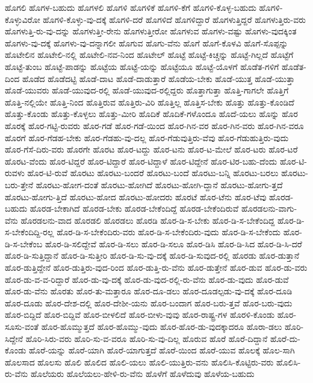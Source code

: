 {ಹೊಗಲಿ
ಹೊಗಳ-ಬಹುದು
ಹೊಗಳಲಿ
ಹೊಗಳಿ
ಹೊಗಳಿಕೆ
ಹೊಗಳಿ-ಕೆಗೆ
ಹೊಗಳಿ-ಕೊಳ್ಳ-ಬಹುದು
ಹೊಗಳಿ-ಕೊಳ್ಳುವಿರೋ
ಹೊಗಳಿ-ಕೊಳ್ಳು-ವು-ದಕ್ಕೆ
ಹೊಗಳಿ-ದರೆ
ಹೊಗಳಿದೆ
ಹೊಗಳಿದ್ದಾರೆ
ಹೊಗಳುತ್ತಿದ್ದರೆ
ಹೊಗಳುತ್ತಿರು-ವರು
ಹೊಗಳುತ್ತಿ-ರು-ವು-ದನ್ನು
ಹೊಗಳುತ್ತೀ-ರೇನು
ಹೊಗಳುತ್ತೀರೋ
ಹೊಗಳುವ
ಹೊಗಳು-ವಷ್ಟು
ಹೊಗಳು-ವುದಕ್ಕಿಂತ
ಹೊಗಳು-ವು-ದಕ್ಕೆ
ಹೊಗಳು-ವು-ದನ್ನಾಗಲೀ
ಹೊಗುವ
ಹೊಗು-ವೆನು
ಹೊಗೆ
ಹೊಗೆ-ಕೊಳವಿ
ಹೊಗೆ-ಸೊಪ್ಪನ್ನು
ಹೊಟೇಲಿನ
ಹೊಟೇಲಿ-ನಲ್ಲಿ
ಹೊಟೇಲಿ-ನವ-ನಿಂದ
ಹೊಟೇಲ್
ಹೊಟ್ಟೆ
ಹೊಟ್ಟೆ-ಕಿಚ್ಚನ್ನು
ಹೊಟ್ಟೆ-ಗಿಲ್ಲದೆ
ಹೊಟ್ಟೆಗೆ
ಹೊಟ್ಟೆ-ತುಂಬ
ಹೊಟ್ಟೆ-ಪಾಡನ್ನು
ಹೊಟ್ಟೆಯ
ಹೊಟ್ಟೆ-ಯನ್ನು
ಹೊಟ್ಟೆಯೂ
ಹೊಟ್ಟೆ-ಯೊಳಗೆ
ಹೊಡೆತ-ಗಳಿಗೆ
ಹೊಡೆತ-ದಿಂದ
ಹೊಡೆದ
ಹೊಡೆದಟ್ಟಿ
ಹೊಡೆ-ದಾಟ
ಹೊಡೆ-ದಾಡುತ್ತಾರೆ
ಹೊಡೆಯ-ಬೇಕು
ಹೊಡೆ-ಯುತ್ತ
ಹೊಡೆ-ಯುತ್ತಾ
ಹೊಡೆ-ಯುವರು
ಹೊಡೆ-ಯುವುದ-ರಲ್ಲಿ
ಹೊಡೆ-ಯುವುದ-ರಲ್ಲಿದ್ದರು
ಹೊತ್ತಾಗುತ್ತಾ
ಹೊತ್ತಿ-ಗಾಗಲೇ
ಹೊತ್ತಿಗೆ
ಹೊತ್ತಿ-ನಲ್ಲಿಯೇ
ಹೊತ್ತಿ-ನಿಂದ
ಹೊತ್ತಿರುವ
ಹೊತ್ತಿರು-ವಿರಿ
ಹೊತ್ತಿಲ್ಲ
ಹೊತ್ತಿಸ-ಬೇಕು
ಹೊತ್ತು
ಹೊತ್ತು-ಕೊಂಡಿದೆ
ಹೊತ್ತು-ಕೊಂಡು
ಹೊತ್ತು-ಕೊಳ್ಳಲು
ಹೊತ್ತು-ಮೀರಿ
ಹೊದಿಕೆ
ಹೊದಿಕೆ-ಗಳೊಂದೂ
ಹೊದೆ-ಯಲು
ಹೊನ್ನು
ಹೊರ
ಹೊರಕ್ಕೆ
ಹೊರ-ಗಟ್ಟಿ-ರುವರು
ಹೊರ-ಗಡೆ
ಹೊರ-ಗಡೆ-ಯಿಂದ
ಹೊರ-ಗಿನ-ವರ
ಹೊರ-ಗಿನ-ವರು
ಹೊರ-ಗಿನ-ವರೂ
ಹೊರಗೆ
ಹೊರ-ಗೆಡಹ-ಬೇಕು
ಹೊರ-ಗೆಡಹು-ವು-ದಲ್ಲ
ಹೊರ-ಗೆಡುವುತ್ತಿರು-ವೆವು
ಹೊರ-ಗೆಡುಹುತ್ತಿರು-ವುದು
ಹೊರ-ಗೆಸೆ-ದಿರು-ವರು
ಹೊರಗೇ
ಹೊರಟ
ಹೊರ-ಟದ್ದು
ಹೊರ-ಟನು
ಹೊರ-ಟ-ಮೇಲೆ
ಹೊರ-ಟರು
ಹೊರ-ಟರೆ
ಹೊರಟ-ವೆಂದು
ಹೊರ-ಟಿದ್ದರೆ
ಹೊರ-ಟಿದ್ದಾರೆ
ಹೊರ-ಟಿದ್ದಾಳೆ
ಹೊರ-ಟಿದ್ದೇನೆ
ಹೊರ-ಟಿರ-ಬಹು-ದೆಂದು
ಹೊರ-ಟಿ-ರುವಳು
ಹೊರ-ಟಿ-ರುವೆ
ಹೊರಟು
ಹೊರಟು-ಬಂದರೆ
ಹೊರಟು-ಬಂದೆ
ಹೊರಟು-ಬನ್ನಿ
ಹೊರಟು-ಬರಲು
ಹೊರಟು-ಬರು-ತ್ತೇನೆ
ಹೊರಟು-ಹೋಗ-ದಂತೆ
ಹೊರಟು-ಹೋಗಿದೆ
ಹೊರಟು-ಹೋಗಿ-ದ್ದಾನೆ
ಹೊರಟು-ಹೋಗು-ತ್ತದೆ
ಹೊರಟು-ಹೋಗು-ತ್ತಿದೆ
ಹೊರಟು-ಹೋದ
ಹೊರಟು-ಹೋದರು
ಹೊರಟೆ
ಹೊರ-ಟೆನು
ಹೊರ-ಟೆವು
ಹೊರಡ-ಬಹುದು
ಹೊರಡ-ಬೇಕಾಗಿದೆ
ಹೊರಡ-ಬೇಕು
ಹೊರಡ-ಬೇಕೆಂದಿದ್ದೆ
ಹೊರಡ-ಬೇಕೆಂದಿರುವೆ
ಹೊರಡಲನು-ವಾಗು-ವೆನು
ಹೊರಡಲನು-ವಾದ
ಹೊರಡಲಿ
ಹೊರಡಲು
ಹೊರಡಿ
ಹೊರ-ಡಿ-ಸ-ಬೇಕು
ಹೊರ-ಡಿ-ಸ-ಬೇಕೆಂದಿದ್ದ
ಹೊರ-ಡಿ-ಸ-ಬೇಕೆಂದಿದ್ದಿ-ರಲ್ಲ
ಹೊರ-ಡಿ-ಸ-ಬೇಕೆಂದಿರು-ವರು
ಹೊರ-ಡಿ-ಸ-ಬೇಕೆಂದಿರು-ವುದು
ಹೊರ-ಡಿ-ಸ-ಬೇಕೆಂದು
ಹೊರ-ಡಿ-ಸ-ಬೇಕೆಂಬ
ಹೊರ-ಡಿ-ಸಲಿದ್ದೇವೆ
ಹೊರ-ಡಿ-ಸಲು
ಹೊರ-ಡಿ-ಸಲೂ
ಹೊರ-ಡಿಸಿ
ಹೊರ-ಡಿ-ಸಿದ
ಹೊರ-ಡಿ-ಸಿ-ದರೆ
ಹೊರ-ಡಿ-ಸುತ್ತಿದ್ದಾನೆ
ಹೊರ-ಡಿ-ಸುತ್ತೀರಿ
ಹೊರ-ಡಿ-ಸು-ವು-ದಕ್ಕೆ
ಹೊರ-ಡಿ-ಸುವುದ-ರಲ್ಲಿ
ಹೊರಡು
ಹೊರ-ಡುತ್ತಾನೆ
ಹೊರ-ಡುತ್ತಿದ್ದೇನೆ
ಹೊರ-ಡುತ್ತಿರು-ವುದ-ರಿಂದ
ಹೊರ-ಡುತ್ತಿ-ರು-ವೆನು
ಹೊರ-ಡುತ್ತೇನೆ
ಹೊರ-ಡುವ
ಹೊರ-ಡು-ವರು
ಹೊರ-ಡು-ವ-ವ-ರಿದ್ದಾರೆ
ಹೊರ-ಡು-ವು-ದಕ್ಕೆ
ಹೊರ-ಡು-ವುದ-ರಲ್ಲಿ-ರು-ವೆನು
ಹೊರ-ಡು-ವುದು
ಹೊರ-ಡುವೆ
ಹೊರ-ಡು-ವೆನು
ಹೊರತು
ಹೊರ-ತು-ಮತ್ತಾರೂ
ಹೊರ-ದೂ-ಡಲು
ಹೊರ-ದೂಡಲ್ಪಡು-ವು-ದಕ್ಕೆ
ಹೊರ-ದೂಡಿ
ಹೊರ-ದೂಡು
ಹೊರ-ದೇಶ-ದಲ್ಲಿ
ಹೊರ-ದೇಶೀ-ಯನು
ಹೊರ-ಬಂದಾಗ
ಹೊರ-ಬರು-ತ್ತವೆ
ಹೊರ-ಬರು-ವುದು
ಹೊರ-ಬಿದ್ದಿದೆ
ಹೊರ-ಬಿದ್ದಿವೆ
ಹೊರ-ಬೀಳಲಿದೆ
ಹೊರ-ಬೀಳು-ವುವು
ಹೊರ-ರಾಷ್ಟ್ರ-ಗಳ
ಹೊರಳಿ-ಕೊಂಡು
ಹೊರ-ಸೂಸು-ವಂತೆ
ಹೊರ-ಹೊಮ್ಮುತ್ತದೆ
ಹೊರ-ಹೊಮ್ಮು-ವುದು
ಹೊರ-ಹೊರ-ಡು-ವುದಕ್ಕಾದರೂ
ಹೊರಾ-ಡಲು
ಹೊರಿ-ಸಿದ್ದೇನೆ
ಹೊರಿ-ಸಿರು-ವರು
ಹೊರಿ-ಸು-ವ-ವರೂ
ಹೊರಿ-ಸು-ವು-ದಿಲ್ಲ
ಹೊರುವ
ಹೊರೆ
ಹೊರೆ-ದಿದ್ದಾನೆ
ಹೊರೆ-ದು-ಕೊಂಡು
ಹೊರೆ-ಯನ್ನು
ಹೊರೆ-ಯಾಗಿ
ಹೊರೆ-ಯಾಗುತ್ತದೆ
ಹೊರೆ-ಯಿಂದ
ಹೊರೆ-ಯುವ
ಹೊಲಕ್ಕೆ
ಹೊಲ-ಸಾಗಿ
ಹೊಲಸಾದ
ಹೊಲಸು
ಹೊಲಿ
ಹೊಲಿದ
ಹೊಲಿ-ಯಲು
ಹೊಲಿ-ಯುತ್ತಿರು-ವನು
ಹೊಲಿಸಿ-ಕೊಟ್ಟಿರು-ವರು
ಹೊಲಿಸಿ-ರು-ವೆನು
ಹೊಲೆಯರು
ಹೊಲೆಯಲು-ಹೇಳಿ-ರು-ವೆನು
ಹೊಳೆಗೆ
ಹೊಳೆದುವು
ಹೊಳೆಯ-ಬಹುದು
}
